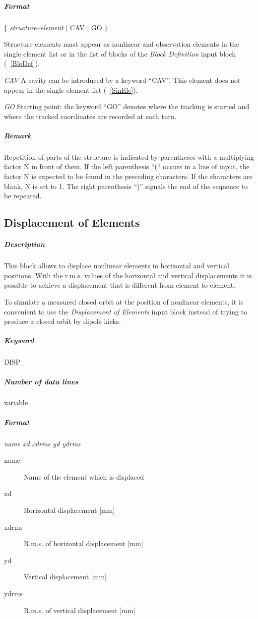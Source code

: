 \documentclass[a4paper,11pt]{report}
\begin{document}
\subparagraph{Format} \{ {\em structure--element} \/$\vert$ CAV
$\vert$ GO \}

\begin{description}
\item [structure--element] Structure elements must appear as nonlinear
  and observation elements in the single element list or in the list
  of blocks of the {\em Block Definition} \/input block
  (~\ref{BloDef}).
\item {\em CAV} \/A cavity can be introduced by a keyword ``CAV''.
  This element does not appear in the single element list
  (~\ref{SinEle}).
\item {\em GO} \/Starting point: the keyword ``GO'' denotes where the
  tracking is started and where the tracked coordinates are recorded
  at each turn.
\end{description}

\subparagraph{Remark} Repetition of parts of the structure is
indicated by parentheses with a multiplying factor N in front of them.
If the left parenthesis ``(`` occurs in a line of input, the factor N
is expected to be found in the preceding characters. If the characters
are blank, N is set to 1.  The right parenthesis ``)'' signals the end
of the sequence to be repeated.

\subsection{Displacement of Elements} \label{DisEle}

\subparagraph{Description} This block allows to displace nonlinear
elements in horizontal and vertical positions.  With the r.m.s. values of
the horizontal and vertical displacements it is possible to achieve a
displacement that is different from element to element.

To simulate a measured closed orbit at the position of nonlinear
elements, it is convenient to use the {\em Displacement of Elements}
\/input block instead of trying to produce a closed orbit by dipole
kicks.

\subparagraph{Keyword} DISP \subparagraph{Number of data lines}
variable

\subparagraph{Format} {\em name xd xdrms yd ydrms}

\begin{description}
\item [name] Name of the element which is displaced
\item [xd] Horizontal displacement [mm]
\item [xdrms] R.m.s. of horizontal displacement [mm]
\item [yd] Vertical displacement [mm]
\item [ydrms] R.m.s. of vertical displacement [mm]
\end{description}
\end{document}
